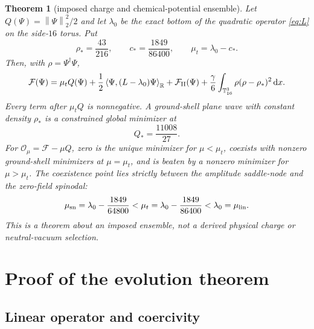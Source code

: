 \documentclass[11pt]{article}
\numberwithin{equation}{section}
\newtheorem{theorem}{Theorem}[section]
\theoremstyle{definition}
\newcommand{\T}{\mathbb T}
\newcommand{\R}{\mathbb R}
\newcommand{\cF}{\mathcal F}
\newcommand{\cO}{\mathcal O}
\newcommand{\dd}{\,\mathrm d}
\newcommand{\norm}[1]{\left\lVert#1\right\rVert}
\newcommand{\ip}[2]{\left\langle #1,#2\right\rangle}
\begin{document}
\begin{theorem}[imposed charge and chemical-potential ensemble]
\label{thm:r158-ensemble}
Let $Q(\Psi)=\norm{\Psi}_2^2/2$ and let $\lambda_0$ be the exact bottom of
the quadratic operator \eqref{eq:L} on the side-$16$ torus.  Put
\begin{equation}
 \rho_* = \frac{43}{216},\qquad
 c_* = \frac{1849}{86400},\qquad \mu_t=\lambda_0-c_*.
 \label{eq:ensemble-constants}
\end{equation}
Then, with $\rho=\Psi^\dagger\Psi$,
\begin{equation}
 \cF(\Psi)=\mu_t Q(\Psi)
 +\frac12\ip{\Psi}{(L-\lambda_0)\Psi}_{\R}
 +\cF_{\rm II}(\Psi)
 +\frac\gamma6\int_{\T^3_{16}}\rho(\rho-\rho_*)^2\dd x.
 \label{eq:ensemble-decomp}
\end{equation}
Every term after $\mu_tQ$ is nonnegative.  A ground-shell plane wave with
constant density $\rho_*$ is a constrained global minimizer at
\begin{equation}
 Q_*=\frac{11008}{27}.
 \label{eq:Qstar}
\end{equation}
For $\cO_\mu=\cF-\mu Q$, zero is the unique minimizer for $\mu<\mu_t$,
coexists with nonzero ground-shell minimizers at $\mu=\mu_t$, and is beaten
by a nonzero minimizer for $\mu>\mu_t$.  The coexistence point lies strictly
between the amplitude saddle-node and the zero-field spinodal:
\begin{equation}
 \mu_{\rm sn}=\lambda_0-\frac{1849}{64800}<
 \mu_t=\lambda_0-\frac{1849}{86400}<\lambda_0=\mu_{\rm lin}.
 \label{eq:first-order-ordering}
\end{equation}
This is a theorem about an imposed ensemble, not a derived physical charge or
neutral-vacuum selection.
\end{theorem}

\section{Proof of the evolution theorem}
\label{sec:evolution-proof}

\subsection{Linear operator and coercivity}
\end{document}
